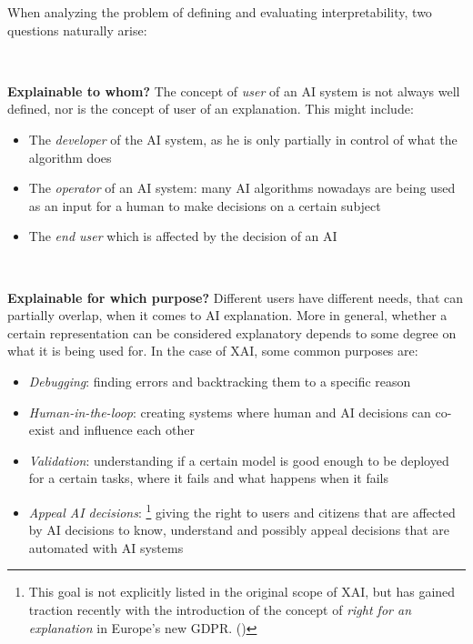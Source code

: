 \documentclass[conference]{IEEEtran}
\begin{document}
When analyzing the problem of defining and evaluating interpretability, two questions naturally arise:

\

\textbf{Explainable to whom?} The concept of \textit{user} of an AI system is
not always well defined, nor is the concept of user of an explanation. This
might include:

\begin{itemize}
    \item The \textit{developer} of the AI system, as he is only partially in
          control of what the algorithm does
    \item The \textit{operator} of an AI system: many AI algorithms nowadays are
          being used as an input for a human to make decisions on a certain
          subject
    \item The \textit{end user} which is affected by the decision of an AI
\end{itemize}

\

\textbf{Explainable for which purpose?} Different users have different needs,
that can partially overlap, when it comes to AI explanation. More in general,
whether a certain representation can be considered explanatory depends to some
degree on what it is being used for. In the case of XAI, some common purposes
are:

\begin{itemize}
    \item \textit{Debugging}: finding errors and backtracking them to a specific reason
    \item \textit{Human-in-the-loop}: creating systems where human and AI
          decisions can co-exist and influence each other
    \item \textit{Validation}: understanding if a certain model is good enough
          to be deployed for a certain tasks, where it fails and what happens
          when it fails
    \item \textit{Appeal AI decisions}: \footnote{This goal is not
              explicitly listed in the original scope of XAI, but has
              gained traction recently with the introduction of the concept of \textit{right for an explanation} in Europe's new GDPR. (\citet{righttoexpl})} giving the right to
          users and citizens that are affected by AI decisions to know,
          understand and possibly appeal decisions that are automated with
          AI systems
\end{itemize}
\end{document}

